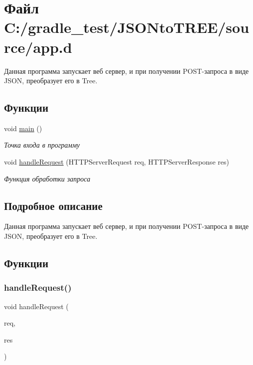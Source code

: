 \hypertarget{app_8d}{}\section{Файл C\+:/gradle\+\_\+test/\+J\+S\+O\+Nto\+T\+R\+E\+E/source/app.d}
\label{app_8d}


Данная программа запускает веб сервер, и при получении P\+O\+S\+T-\/запроса в виде J\+S\+ON, преобразует его в Tree.  


\subsection*{Функции}
\begin{DoxyCompactItemize}
\item 
void \mbox{\hyperlink{app_8d_acdef7a1fd863a6d3770c1268cb06add3}{main}} ()
\begin{DoxyCompactList}\small\item\em Точка входа в программу \end{DoxyCompactList}\item 
void \mbox{\hyperlink{app_8d_aa826b13b64841dc3a91ac2f7cc128670}{handle\+Request}} (H\+T\+T\+P\+Server\+Request req, H\+T\+T\+P\+Server\+Response res)
\begin{DoxyCompactList}\small\item\em Функция обработки запроса \end{DoxyCompactList}\end{DoxyCompactItemize}


\subsection{Подробное описание}
Данная программа запускает веб сервер, и при получении P\+O\+S\+T-\/запроса в виде J\+S\+ON, преобразует его в Tree. 



\subsection{Функции}
\mbox{\label{app_8d_aa826b13b64841dc3a91ac2f7cc128670}} 
\subsubsection{\texorpdfstring{handle\+Request()}{handleRequest()}}
{\footnotesize\ttfamily void handle\+Request (\begin{DoxyParamCaption}\item[{H\+T\+T\+P\+Server\+Request}]{req,  }\item[{H\+T\+T\+P\+Server\+Response}]{res }\end{DoxyParamCaption})}



